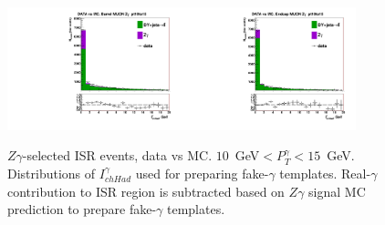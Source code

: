 \begin{figure}[htb]
  \begin{center}
   \includegraphics[width=0.45\textwidth]{../figs/figs_v11/MUON_ZGamma/PrepareYields/c_TotalDATAvsMC_Barrel__phoPFChIsoCorrFSR_EXCLUDED_pt10to15_.pdf}\includegraphics[width=0.45\textwidth]{../figs/figs_v11/MUON_ZGamma/PrepareYields/c_TotalDATAvsMC_Endcap__phoPFChIsoCorrFSR_EXCLUDED_pt10to15_.pdf}\\
  \caption{$Z\gamma$-selected ISR events, data vs MC. $10$~GeV$<P_T^{\gamma}<15$~GeV. Distributions of $I_{chHad}^{\gamma}$ used for preparing fake-$\gamma$ templates. Real-$\gamma$ contribution to ISR region is subtracted based on $Z\gamma$ signal MC prediction to prepare fake-$\gamma$ templates.}
  \label{fig:Zg_ISR_phoPFChIsoCorr_pt10to15}
  \end{center}
\end{figure}

